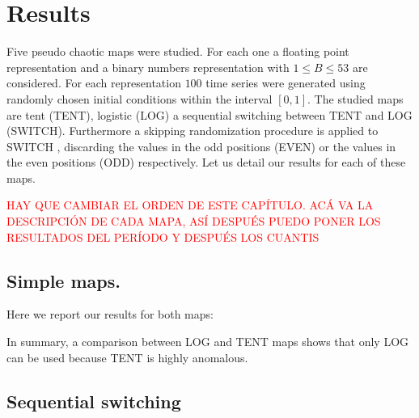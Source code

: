 \section{Results}\label{sec:resultados}
Five pseudo chaotic maps were studied. For each one a floating point representation and a binary numbers representation with $1\leq B \leq 53$ are considered.
For each representation $100$ time series were generated using randomly chosen initial conditions within the interval $[0,1]$.
The studied maps are tent (TENT), logistic (LOG) a sequential switching between TENT and LOG (SWITCH).
Furthermore a skipping randomization procedure is applied to SWITCH \cite{DeMicco2008}, discarding the values in the odd positions (EVEN) or the values in the even positions (ODD) respectively.
Let us detail our results for each of these maps.

\textcolor{red}{HAY QUE CAMBIAR EL ORDEN DE ESTE CAPÍTULO. ACÁ VA LA DESCRIPCIÓN DE CADA MAPA, ASÍ DESPUÉS PUEDO PONER LOS RESULTADOS DEL PERÍODO Y DESPUÉS LOS CUANTIS}

\subsection {Simple maps.}\label{subsec:SimpleMaps}
Here we report our results for both maps:





In summary, a comparison between LOG and TENT maps shows that only LOG  can be used because TENT is highly anomalous. 

\subsection{Sequential switching}\label{subsec:SecSwitch}





